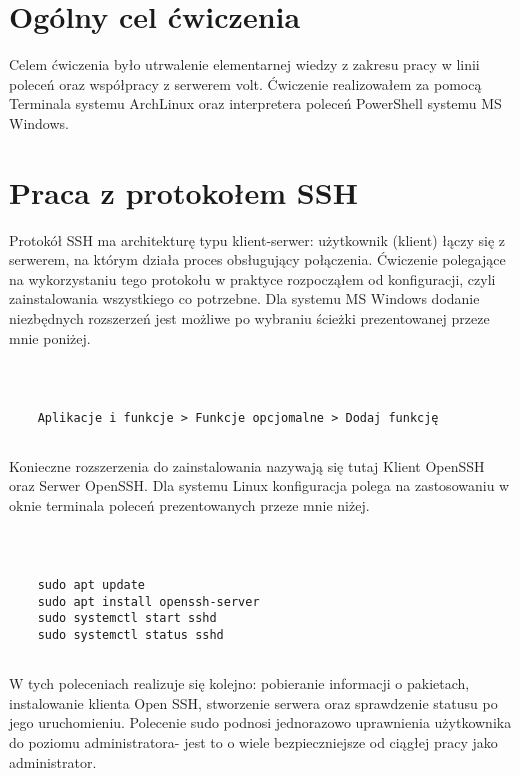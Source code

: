 \documentclass[a4paper,11pt]{article}
\begin{document}

\section{Ogólny cel ćwiczenia}

Celem ćwiczenia było utrwalenie elementarnej wiedzy z zakresu pracy w linii poleceń oraz współpracy z serwerem volt. Ćwiczenie realizowałem za pomocą Terminala systemu ArchLinux oraz interpretera poleceń PowerShell systemu MS Windows.

\section{Praca z protokołem SSH}

Protokół SSH ma architekturę typu klient-serwer: użytkownik (klient) łączy się z serwerem, na którym działa proces obsługujący połączenia. Ćwiczenie polegające na wykorzystaniu tego protokołu w praktyce rozpocząłem od konfiguracji, czyli zainstalowania wszystkiego co potrzebne. Dla systemu MS Windows dodanie niezbędnych rozszerzeń jest możliwe po wybraniu ścieżki prezentowanej przeze mnie poniżej.

{\tt
\begin{verbatim}

    Aplikacje i funkcje > Funkcje opcjomalne > Dodaj funkcję
    
\end{verbatim}
}

Konieczne rozszerzenia do zainstalowania nazywają się tutaj Klient OpenSSH oraz Serwer OpenSSH. Dla systemu Linux konfiguracja polega na zastosowaniu w oknie terminala poleceń prezentowanych przeze mnie niżej.

{\tt
\begin{verbatim}

    sudo apt update
    sudo apt install openssh-server
    sudo systemctl start sshd
    sudo systemctl status sshd
    
\end{verbatim}
}

W tych poleceniach realizuje się kolejno: pobieranie informacji o pakietach, instalowanie klienta Open SSH, stworzenie serwera oraz sprawdzenie statusu po jego uruchomieniu. Polecenie sudo podnosi jednorazowo uprawnienia użytkownika do poziomu administratora- jest to o wiele bezpieczniejsze od ciągłej pracy jako administrator.
\end{document}
